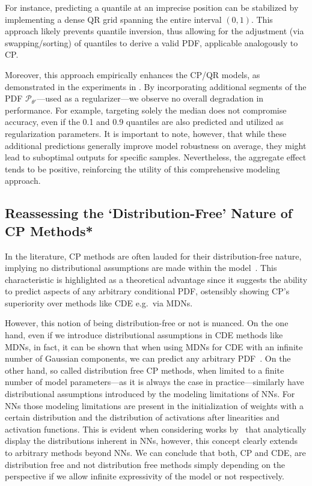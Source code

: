 For instance, predicting a quantile at an imprecise position can be stabilized by implementing a dense QR grid spanning the entire interval $(0,1)$. This approach likely prevents quantile inversion, thus allowing for the adjustment (via swapping/sorting) of quantiles to derive a valid PDF, applicable analogously to CP.\@

Moreover, this approach empirically enhances the CP/QR models, as demonstrated in the experiments in . By incorporating additional segments of the PDF $\mathcal{P}_{\theta'}$—used as a regularizer—we observe no overall degradation in performance. For example, targeting solely the median does not compromise accuracy, even if the 0.1 and 0.9 quantiles are also predicted and utilized as regularization parameters. It is important to note, however, that while these additional predictions generally improve model robustness on average, they might lead to suboptimal outputs for specific samples. Nevertheless, the aggregate effect tends to be positive, reinforcing the utility of this comprehensive modeling approach.

\subsection{Reassessing the `Distribution-Free' Nature of CP Methods*}

In the literature, CP methods are often lauded for their distribution-free nature, implying no distributional assumptions are made within the model~\cite{angelopoulos2021gentle}. This characteristic is highlighted as a theoretical advantage since it suggests the ability to predict aspects of any arbitrary conditional PDF, ostensibly showing CP's superiority over methods like CDE e.g.\ via MDNs.

However, this notion of being distribution-free or not is nuanced. On the one hand, even if we introduce distributional assumptions in CDE methods like MDNs, in fact, it can be shown that when using MDNs for CDE with an infinite number of Gaussian components, we can predict any arbitrary PDF~\cite{bishop1994mixture}. On the other hand, so called distribution free CP methods, when limited to a finite number of model parameters—as it is always the case in practice—similarly have distributional assumptions introduced by the modeling limitations of NNs. For NNs those modeling limitations are present in the initialization of weights with a certain distribution and the distribution of activations after linearities and activation functions. This is evident when considering works by~\cite{klambauer2017self, ioffe2015batch} that analytically display the distributions inherent in NNs, however, this concept clearly extends to arbitrary methods beyond NNs. We can conclude that both, CP and CDE, are distribution free and not distribution free methods simply depending on the perspective if we allow infinite expressivity of the model or not respectively.

